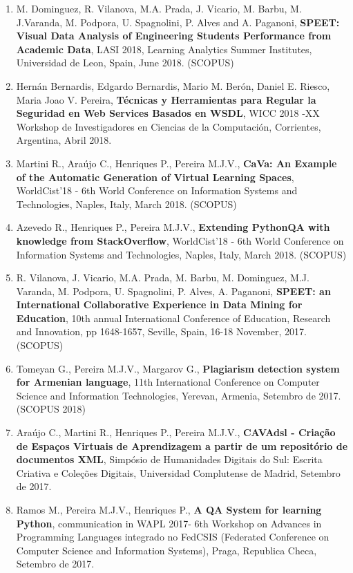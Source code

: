 \documentclass[11pt]{article}
\begin{document}
\begin{enumerate}
\item{M. Dominguez, R. Vilanova, M.A. Prada, J. Vicario, M. Barbu, M. J.Varanda, M. Podpora, U. Spagnolini, P. Alves and A. Paganoni, {
\bf{ SPEET: Visual Data Analysis of Engineering Students Performance from Academic Data}}, LASI 2018, Learning Analytics Summer Institutes, Universidad de Leon, Spain, June 2018. (SCOPUS)}
\item{Hernán Bernardis, Edgardo Bernardis, Mario M. Berón, Daniel E. Riesco, Maria Joao V. Pereira, {
\bf{ Técnicas y Herramientas para Regular la Seguridad en Web Services Basados en WSDL}}, WICC 2018 -XX Workshop de Investigadores en Ciencias de la Computación, Corrientes, Argentina, Abril 2018.}
\item{Martini R., Araújo C., Henriques P., Pereira M.J.V., {
\bf{ CaVa: An Example of the Automatic Generation of Virtual Learning Spaces}}, WorldCist'18 - 6th World Conference on Information Systems and Technologies, Naples, Italy, March 2018. (SCOPUS)}
\item{Azevedo R., Henriques P., Pereira M.J.V., {
\bf{ Extending PythonQA with knowledge from StackOverflow}}, WorldCist'18 - 6th World Conference on Information Systems and Technologies, Naples, Italy, March 2018. (SCOPUS)}
\item{R. Vilanova, J. Vicario, M.A. Prada, M. Barbu, M. Dominguez, M.J. Varanda, M. Podpora, U. Spagnolini, P. Alves, A. Paganoni, {
\bf{ SPEET: an International Collaborative Experience in Data Mining for Education}}, 10th annual International Conference of Education, Research and Innovation, pp 1648-1657, Seville, Spain, 16-18 November, 2017.(SCOPUS)}
\item{Tomeyan G., Pereira M.J.V., Margarov G., {
\bf{ Plagiarism detection system for Armenian language}}, 11th International Conference on Computer Science and Information Technologies, Yerevan, Armenia, Setembro de 2017. (SCOPUS 2018)}
\item{Araújo C., Martini R., Henriques P., Pereira M.J.V., {
\bf{  CAVAdsl - Criação de Espaços Virtuais de Aprendizagem a partir de um repositório de documentos XML}}, Simpósio de Humanidades Digitais do Sul: Escrita Criativa e Coleções Digitais, Universidad Complutense de Madrid, Setembro de 2017.}
\item{Ramos M., Pereira M.J.V., Henriques P., {
\bf{ A QA System for learning Python}}, communication in WAPL 2017- 6th Workshop on Advances in Programming Languages integrado no FedCSIS (Federated Conference on Computer Science and Information Systems), Praga, Republica Checa, Setembro de 2017.}

\end{enumerate}
\end{document}
